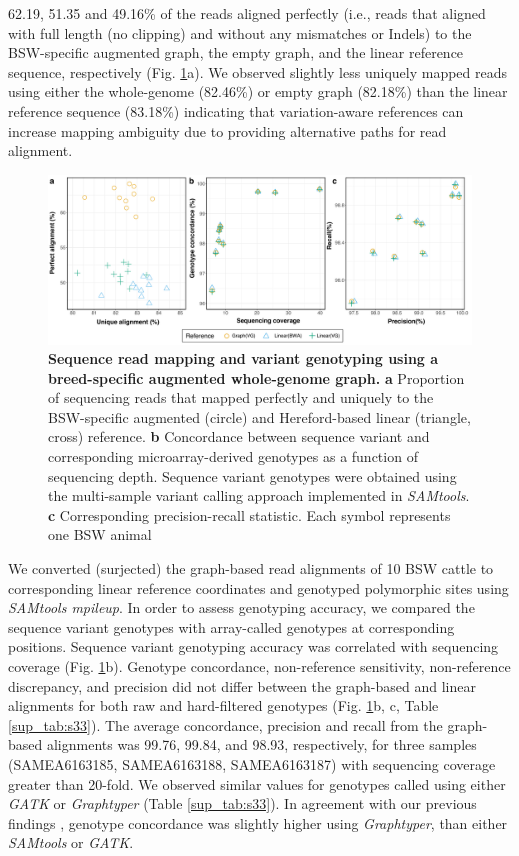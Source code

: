 \documentclass[../main.tex]{subfiles}
\begin{document}
62.19, 51.35 and 49.16\% of the reads aligned perfectly (i.e., reads that aligned with full length (no clipping) and without any mismatches or Indels) to the BSW-specific augmented graph, the empty graph, and the linear reference sequence, respectively (Fig. \ref{fig36:whole}a). We observed slightly less uniquely mapped reads using either the whole-genome (82.46\%) or empty graph (82.18\%) than the linear reference sequence (83.18\%) indicating that variation-aware references can increase mapping ambiguity due to providing alternative paths for read alignment.

\begin{figure}[!htb]
    \centering
    \includegraphics[width=\textwidth]{paper2/main_figure/Fig6.pdf}
    \caption[Variant genotyping from graphs]{\textbf{Sequence read mapping and variant genotyping using a breed-specific augmented whole-genome graph.} 
    \small{\textbf{a} Proportion of sequencing reads that mapped perfectly and uniquely to the BSW-specific augmented (circle) and Hereford-based linear (triangle, cross) reference. \textbf{b} Concordance between sequence variant and corresponding microarray-derived genotypes as a function of sequencing depth. Sequence variant genotypes were obtained using the multi-sample variant calling approach implemented in \emph{SAMtools}. \textbf{c} Corresponding precision-recall statistic. Each symbol represents one BSW animal}}
    \label{fig36:whole}
\end{figure}

We converted (surjected) the graph-based read alignments of 10 BSW cattle to corresponding linear reference coordinates and genotyped polymorphic sites using \emph{SAMtools mpileup}. In order to assess genotyping accuracy, we compared the sequence variant genotypes with array-called genotypes at corresponding positions. Sequence variant genotyping accuracy was correlated with sequencing coverage (Fig. \ref{fig36:whole}b). Genotype concordance, non-reference sensitivity, non-reference discrepancy, and precision did not differ between the graph-based and linear alignments for both raw and hard-filtered genotypes (Fig. \ref{fig36:whole}b, c, Table \ref{sup_tab:s33}). The average concordance, precision and recall from the graph-based alignments was 99.76, 99.84, and 98.93, respectively, for three samples (SAMEA6163185, SAMEA6163188, SAMEA6163187) with sequencing coverage greater than 20-fold. We observed similar values for genotypes called using either \emph{GATK} or \emph{Graphtyper} (Table \ref{sup_tab:s33}). In agreement with our previous findings \citep{crysnanto2019accurate}, genotype concordance was slightly higher using \emph{Graphtyper}, than either \emph{SAMtools} or \emph{GATK}.
\end{document}
